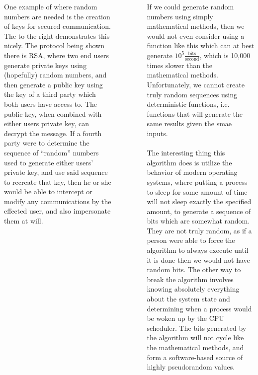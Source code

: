 \documentclass[24pt, a0paper, landscape]{tikzposter}
\begin{document}
\begin{columns}
{\begin{minipage}{0.35\textwidth}
One example of where random numbers are needed is the creation of keys for secured communication. The to the right demonstrates this nicely. The protocol being shown there is RSA, where two end users generate private keys using (hopefully) random numbers, and then generate a public key using the key of a third party which both users have access to. The public key, when combined with either users private key, can decrypt the message. If a fourth party were to determine the sequence of ``random'' numbers used to generate either users' private key, and use said sequence to recreate that key, then he or she would be able to intercept or modify any communications by the effected user, and also impersonate them at will.
\end{minipage}
\begin{minipage}{0.35\textwidth}\
\begin{center}
\end{center}
\end{minipage}
	}
{
If we could generate random numbers using simply mathematical methods, then we would not even consider using a function like this which can at best generate $10^5 \frac{\mathrm{bits}}{\mathrm{second}}$, which is 10,000 times slower than the mathematical methods. Unfortunately, we cannot create truly random sequences using deterministic functions, i.e. functions that will generate the same results given the smae inputs. \\
\\
The interesting thing this algorithm does is utilize the behavior of modern operating systems, where putting a process to sleep for some amount of time will not sleep exactly the specified amount, to generate a sequence of bits which are somewhat random. They are not truly random, as if a person were able to force the algorithm to always execute until it is done then we would not have random bits. The other way to break the algorithm involves knowing absolutely everything about the system state and determining when a process would be woken up by the CPU scheduler. The bits generated by the algorithm will not cycle like the mathematical methods, and form a software-based source of highly pseudorandom values.
}

	{

}
\end{columns}
\end{document}
